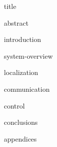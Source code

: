 \documentclass[11pt,titlepage]{report}
\begin{document}
{title}

\clearpage
{abstract}
\tableofcontents
				
\clearpage
{}
{introduction}

{system-overview}

{localization}

{communication}

{control}

{conclusions}

\clearpage
{}
\printbibliography[heading=bibintoc]

\clearpage
{appendices}
\end{document}
